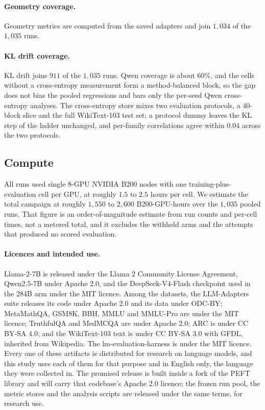 \documentclass[11pt]{article}
\begin{document}
\paragraph{Geometry coverage.} Geometry metrics are computed from the saved
adapters and join $1{,}034$ of the $1{,}035$ runs.

\paragraph{KL drift coverage.} KL drift joins $911$ of the $1{,}035$ runs.
Qwen coverage is about $60\%$, and the cells without a cross-entropy
measurement form a method-balanced block, so the gap does not bias the pooled
regressions and bars only the per-seed Qwen cross-entropy analyses. The cross-entropy store mixes two
evaluation protocols, a 40-block slice and the full WikiText-103 test set; a
protocol dummy leaves the KL step of the ladder unchanged, and per-family
correlations agree within $0.04$ across the two protocols.

\subsection{Compute}\label{app:compute}
All runs used single 8-GPU NVIDIA B200 nodes with one training-plus-evaluation
cell per GPU, at roughly $1.5$ to $2.5$ hours per cell. We estimate the total
campaign at roughly $1{,}550$ to $2{,}600$ B200-GPU-hours over the $1{,}035$
pooled runs. That figure is an order-of-magnitude estimate from run counts and
per-cell times, not a metered total, and it excludes the withheld arms and the
attempts that produced no scored evaluation.

\paragraph{Licences and intended use.} Llama-2-7B is released under the Llama 2
Community License Agreement, Qwen2.5-7B under Apache 2.0, and the
DeepSeek-V4-Flash checkpoint used in the 284B arm under the MIT licence. Among
the datasets, the LLM-Adapters suite releases its code under Apache 2.0 and its
data under ODC-BY; MetaMathQA, GSM8K, BBH, MMLU and MMLU-Pro are under the MIT
licence; TruthfulQA and MedMCQA are under Apache 2.0; ARC is under CC BY-SA
4.0; and the WikiText-103 text is under CC BY-SA 3.0 with GFDL, inherited from
Wikipedia. The lm-evaluation-harness is under the MIT licence. Every one of
these artifacts is distributed for research on language models, and this study
uses each of them for that purpose and in English only, the language they were
collected in. The promised release is built inside a fork of the PEFT library
and will carry that codebase's Apache 2.0 licence; the frozen run pool, the
metric stores and the analysis scripts are released under the same terms, for
research use.
\end{document}
